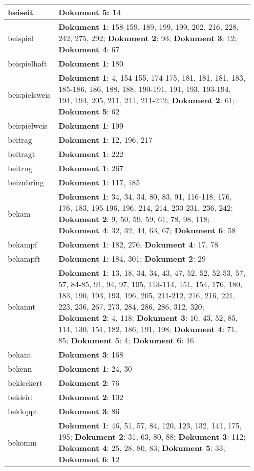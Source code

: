 \documentclass[a5paper]{article}
\begin{document}
\begin{longtable}[l]{|l|p{3in}|}
\hline
beiseit & \textbf{Dokument 5}: 14 \\
\hline
beispiel & \textbf{Dokument 1}: 158-159, 189, 199, 199, 202, 216, 228, 242, 275, 292; \textbf{Dokument 2}: 93; \textbf{Dokument 3}: 12; \textbf{Dokument 4}: 67 \\
\hline
beispielhaft & \textbf{Dokument 1}: 180 \\
\hline
beispielsweis & \textbf{Dokument 1}: 4, 154-155, 174-175, 181, 181, 181, 183, 185-186, 186, 188, 188, 190-191, 191, 193, 193-194, 194, 194, 205, 211, 211, 211-212; \textbf{Dokument 2}: 61; \textbf{Dokument 5}: 62 \\
\hline
beispielweis & \textbf{Dokument 1}: 199 \\
\hline
beitrag & \textbf{Dokument 1}: 12, 196, 217 \\
\hline
beitragt & \textbf{Dokument 1}: 222 \\
\hline
beitrug & \textbf{Dokument 1}: 267 \\
\hline
beizubring & \textbf{Dokument 1}: 117, 185 \\
\hline
bekam & \textbf{Dokument 1}: 34, 34, 34, 80, 83, 91, 116-118, 176, 176, 183, 195-196, 196, 214, 214, 230-231, 236, 242; \textbf{Dokument 2}: 9, 50, 59, 59, 61, 78, 98, 118; \textbf{Dokument 4}: 32, 32, 44, 63, 67; \textbf{Dokument 6}: 58 \\
\hline
bekampf & \textbf{Dokument 1}: 182, 276; \textbf{Dokument 4}: 17, 78 \\
\hline
bekampft & \textbf{Dokument 1}: 184, 301; \textbf{Dokument 2}: 29 \\
\hline
bekannt & \textbf{Dokument 1}: 13, 18, 34, 34, 43, 47, 52, 52, 52-53, 57, 57, 84-85, 91, 94, 97, 105, 113-114, 151, 154, 176, 180, 183, 190, 193, 193, 196, 205, 211-212, 216, 216, 221, 223, 236, 267, 273, 284, 286, 286, 312, 320; \textbf{Dokument 2}: 4, 118; \textbf{Dokument 3}: 10, 43, 52, 85, 114, 130, 154, 182, 186, 191, 198; \textbf{Dokument 4}: 71, 85; \textbf{Dokument 5}: 4; \textbf{Dokument 6}: 16 \\
\hline
bekant & \textbf{Dokument 3}: 168 \\
\hline
bekenn & \textbf{Dokument 1}: 24, 30 \\
\hline
bekleckert & \textbf{Dokument 2}: 76 \\
\hline
bekleid & \textbf{Dokument 2}: 102 \\
\hline
bekloppt & \textbf{Dokument 3}: 86 \\
\hline
bekomm & \textbf{Dokument 1}: 46, 51, 57, 84, 120, 123, 132, 141, 175, 195; \textbf{Dokument 2}: 31, 63, 80, 88; \textbf{Dokument 3}: 112; \textbf{Dokument 4}: 25, 28, 80, 83; \textbf{Dokument 5}: 33; \textbf{Dokument 6}: 12 \\

\end{longtable}
\end{document}
